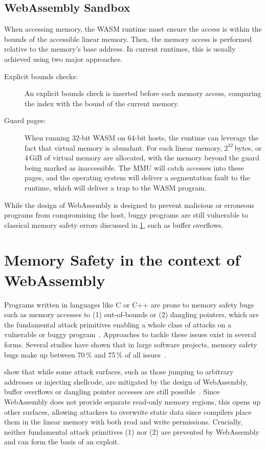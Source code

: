 \subsection{WebAssembly Sandbox}
\label{subsec:webassembly-sandbox}
When accessing memory, the \ac{WASM} runtime must ensure the access is within the bounds of the accessible linear memory.
Then, the memory access is performed relative to the memory's base address.
In current runtimes, this is usually achieved using two major approaches.
\begin{description}
    \item[Explicit bounds checks:] An explicit bounds check is inserted before each memory access, comparing the index with the bound of the current memory.
    \item[Guard pages:] When running 32-bit \ac{WASM} on 64-bit hosts, the runtime can leverage the fact that virtual memory is abundant.
    For each linear memory, $2^{32}$\,bytes, or 4\,GiB of virtual memory are allocated, with the memory beyond the guard being marked as inaccessible.
    The \ac{MMU} will catch accesses into these pages, and the operating system will deliver a segmentation fault to the runtime, which will deliver a trap to the \ac{WASM} program.
\end{description}


While the design of WebAssembly is designed to prevent malicious or erroneous programs from compromising the host, buggy programs are still vulnerable to classical memory safety errors discussed in \cref{sec:memory-safety-wasm}, such as buffer overflows.

\section{Memory Safety in the context of WebAssembly}
\label{sec:memory-safety-wasm}

Programs written in languages like C or C++ are prone to memory safety bugs such as memory accesses to (1) out-of-bounds or (2) dangling pointers, which are the fundamental attack primitives enabling a whole class of attacks on a vulnerable or buggy program~\cite{szekeres2013sok}.
Approaches to tackle these issues exist in several forms.
Several studies have shown that in large software projects, memory safety bugs make up between 70\,\% and 75\,\% of all issues~\cite{chromium_memory_safety,microsoft_memory_safety,android_memory_safety}.

\citeauthor*{lehmann2020everything} show that while some attack surfaces, such as those jumping to arbitrary addresses or injecting shellcode, are mitigated by the design of WebAssembly, buffer overflows or dangling pointer accesses are still possible~\cite{lehmann2020everything}.
Since WebAssembly does not provide separate read-only memory regions, this opens up other surfaces, allowing attackers to overwrite static data since compilers place them in the linear memory with both read and write permissions.
Crucially, neither fundamental attack primitives (1) nor (2) are prevented by WebAssembly and can form the basis of an exploit.

